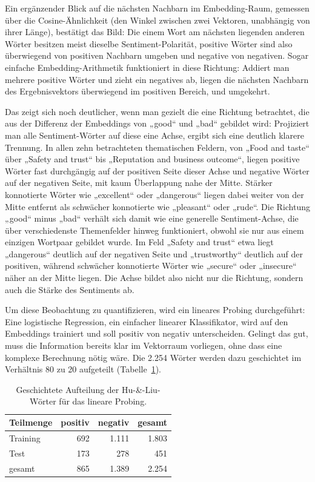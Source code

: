 Ein ergänzender Blick auf die nächsten Nachbarn im Embedding-Raum, gemessen über die Cosine-Ähnlichkeit (den Winkel zwischen zwei Vektoren, unabhängig von ihrer Länge), bestätigt das Bild: Die einem Wort am nächsten liegenden anderen Wörter besitzen meist dieselbe Sentiment-Polarität, positive Wörter sind also überwiegend von positiven Nachbarn umgeben und negative von negativen. Sogar einfache Embedding-Arithmetik funktioniert in diese Richtung: Addiert man mehrere positive Wörter und zieht ein negatives ab, liegen die nächsten Nachbarn des Ergebnisvektors überwiegend im positiven Bereich, und umgekehrt.

Das zeigt sich noch deutlicher, wenn man gezielt die eine Richtung betrachtet, die aus der Differenz der Embeddings von „good“ und „bad“ gebildet wird: Projiziert man alle Sentiment-Wörter auf diese eine Achse, ergibt sich eine deutlich klarere Trennung. In allen zehn betrachteten thematischen Feldern, von „Food and taste“ über „Safety and trust“ bis „Reputation and business outcome“, liegen positive Wörter fast durchgängig auf der positiven Seite dieser Achse und negative Wörter auf der negativen Seite, mit kaum Überlappung nahe der Mitte. Stärker konnotierte Wörter wie „excellent“ oder „dangerous“ liegen dabei weiter von der Mitte entfernt als schwächer konnotierte wie „pleasant“ oder „rude“. Die Richtung „good“ minus „bad“ verhält sich damit wie eine generelle Sentiment-Achse, die über verschiedenste Themenfelder hinweg funktioniert, obwohl sie nur aus einem einzigen Wortpaar gebildet wurde. Im Feld „Safety and trust“ etwa liegt „dangerous“ deutlich auf der negativen Seite und „trustworthy“ deutlich auf der positiven, während schwächer konnotierte Wörter wie „secure“ oder „insecure“ näher an der Mitte liegen. Die Achse bildet also nicht nur die Richtung, sondern auch die Stärke des Sentiments ab.

Um diese Beobachtung zu quantifizieren, wird ein lineares Probing durchgeführt: Eine logistische Regression, ein einfacher linearer Klassifikator, wird auf den Embeddings trainiert und soll positiv von negativ unterscheiden. Gelingt das gut, muss die Information bereits klar im Vektorraum vorliegen, ohne dass eine komplexe Berechnung nötig wäre. Die 2.254 Wörter werden dazu geschichtet im Verhältnis 80 zu 20 aufgeteilt (Tabelle~\ref{tab:split}).

\begin{table}[htbp]
  \centering
  \caption{Geschichtete Aufteilung der Hu-\&-Liu-Wörter für das lineare Probing.}
  \label{tab:split}
  \begin{tabular}{lrrr}
    \toprule
    Teilmenge & positiv & negativ & gesamt \\
    \midrule
    Training & 692 & 1.111 & 1.803 \\
    Test & 173 & 278 & 451 \\
    \midrule
    gesamt & 865 & 1.389 & 2.254 \\
    \bottomrule
  \end{tabular}
\end{table}

